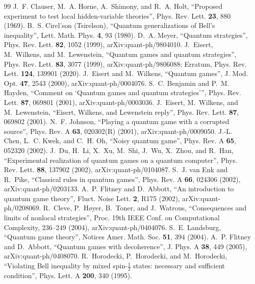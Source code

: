 \documentclass[11pt,a4paper]{article}
\begin{document}
\begin{thebibliography}{99}
 J.~F. Clauser, M.~A. Horne, A.~Shimony, and R.~A. Holt, ``Proposed experiment to test local hidden-variable theories'', Phys. Rev. Lett. \textbf{23}, 880 (1969).
 B.~S. Cirel'son (Tsirelson), ``Quantum generalizations of Bell's inequality'', Lett. Math. Phys. \textbf{4}, 93 (1980).
 D.~A. Meyer, ``Quantum strategies'', Phys. Rev. Lett. \textbf{82}, 1052 (1999), arXiv:quant-ph/9804010.
 J.~Eisert, M.~Wilkens, and M.~Lewenstein, ``Quantum games and quantum strategies'', Phys. Rev. Lett. \textbf{83}, 3077 (1999), arXiv:quant-ph/9806088; Erratum, Phys. Rev. Lett. \textbf{124}, 139901 (2020).
 J.~Eisert and M.~Wilkens, ``Quantum games'', J. Mod. Opt. \textbf{47}, 2543 (2000), arXiv:quant-ph/0004076.
 S.~C. Benjamin and P.~M. Hayden, ``Comment on `Quantum games and quantum strategies''', Phys. Rev. Lett. \textbf{87}, 069801 (2001), arXiv:quant-ph/0003036.
 J.~Eisert, M.~Wilkens, and M.~Lewenstein, ``Eisert, Wilkens, and Lewenstein reply'', Phys. Rev. Lett. \textbf{87}, 069802 (2001).
 N.~F. Johnson, ``Playing a quantum game with a corrupted source'', Phys. Rev. A \textbf{63}, 020302(R) (2001), arXiv:quant-ph/0009050.
 J.-L. Chen, L.~C. Kwek, and C.~H. Oh, ``Noisy quantum game'', Phys. Rev. A \textbf{65}, 052320 (2002).
 J.~Du, H.~Li, X.~Xu, M.~Shi, J.~Wu, X.~Zhou, and R.~Han, ``Experimental realization of quantum games on a quantum computer'', Phys. Rev. Lett. \textbf{88}, 137902 (2002), arXiv:quant-ph/0104087.
 S.~J. van Enk and R.~Pike, ``Classical rules in quantum games'', Phys. Rev. A \textbf{66}, 024306 (2002), arXiv:quant-ph/0203133.
 A.~P. Flitney and D.~Abbott, ``An introduction to quantum game theory'', Fluct. Noise Lett. \textbf{2}, R175 (2002), arXiv:quant-ph/0208069.
 R.~Cleve, P.~H\o{}yer, B.~Toner, and J.~Watrous, ``Consequences and limits of nonlocal strategies'', Proc. 19th IEEE Conf. on Computational Complexity, 236--249 (2004), arXiv:quant-ph/0404076.
 S.~E. Landsburg, ``Quantum game theory'', Notices Amer. Math. Soc. \textbf{51}, 394 (2004).
 A.~P. Flitney and D.~Abbott, ``Quantum games with decoherence'', J. Phys. A \textbf{38}, 449 (2005), arXiv:quant-ph/0408070.
 R.~Horodecki, P.~Horodecki, and M.~Horodecki, ``Violating Bell inequality by mixed spin-$\tfrac12$ states: necessary and sufficient condition'', Phys. Lett. A \textbf{200}, 340 (1995).

\end{thebibliography}
\end{document}
